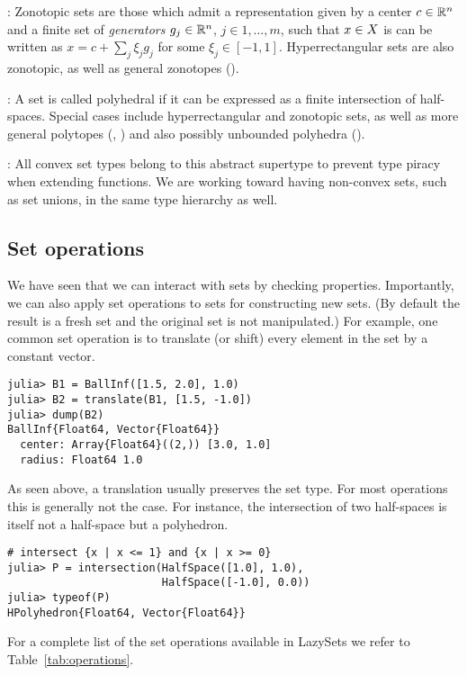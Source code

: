 \smallskip

: Zonotopic sets are those which admit a representation given by a center $c \in \mathbb{R}^n$ and a finite set of \emph{generators} $g_j \in \mathbb{R}^n$, $j \in 1, \ldots, m$, such that $x \in X$ is can be written as $x = c + \sum_j \xi_j g_j$ for some $\xi_j \in [-1, 1]$. Hyperrectangular sets are also zonotopic, as well as general zonotopes ().

\smallskip

: A set is called polyhedral if it can be expressed as a finite intersection of half-spaces. Special cases include hyperrectangular and zonotopic sets, as well as more general polytopes (, ) and also possibly unbounded polyhedra ().

\smallskip

: All convex set types belong to this abstract supertype to prevent type piracy when extending  functions.
We are working toward having non-convex sets, such as set unions, in the same type hierarchy as well.


\subsection{Set operations}

We have seen that we can interact with sets by checking properties.
Importantly, we can also apply set operations to sets for constructing new sets.
(By default the result is a fresh set and the original set is not manipulated.)
For example, one common set operation is to translate (or shift) every element in the set by a constant vector.

\begin{minipage}{\linewidth}
\begin{lstlisting}
julia> B1 = BallInf([1.5, 2.0], 1.0)
julia> B2 = translate(B1, [1.5, -1.0])
julia> dump(B2)
BallInf{Float64, Vector{Float64}}
  center: Array{Float64}((2,)) [3.0, 1.0]
  radius: Float64 1.0
\end{lstlisting}
\end{minipage}

As seen above, a translation usually preserves the set type.
For most operations this is generally not the case.
For instance, the intersection of two half-spaces is itself not a half-space but a polyhedron.

\begin{minipage}{\linewidth}
\begin{lstlisting}
# intersect {x | x <= 1} and {x | x >= 0}
julia> P = intersection(HalfSpace([1.0], 1.0),
                        HalfSpace([-1.0], 0.0))
julia> typeof(P)
HPolyhedron{Float64, Vector{Float64}}
\end{lstlisting}
\end{minipage}

For a complete list of the set operations available in LazySets we refer to Table~\ref{tab:operations}.
